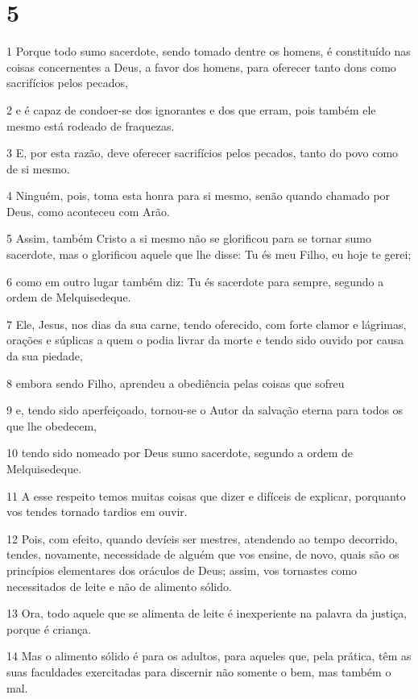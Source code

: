 \chapter{5}

\par 1 Porque todo sumo sacerdote, sendo tomado dentre os homens, é constituído nas coisas concernentes a Deus, a favor dos homens, para oferecer tanto dons como sacrifícios pelos pecados,
\par 2 e é capaz de condoer-se dos ignorantes e dos que erram, pois também ele mesmo está rodeado de fraquezas.
\par 3 E, por esta razão, deve oferecer sacrifícios pelos pecados, tanto do povo como de si mesmo.
\par 4 Ninguém, pois, toma esta honra para si mesmo, senão quando chamado por Deus, como aconteceu com Arão.
\par 5 Assim, também Cristo a si mesmo não se glorificou para se tornar sumo sacerdote, mas o glorificou aquele que lhe disse: Tu és meu Filho, eu hoje te gerei;
\par 6 como em outro lugar também diz: Tu és sacerdote para sempre, segundo a ordem de Melquisedeque.
\par 7 Ele, Jesus, nos dias da sua carne, tendo oferecido, com forte clamor e lágrimas, orações e súplicas a quem o podia livrar da morte e tendo sido ouvido por causa da sua piedade,
\par 8 embora sendo Filho, aprendeu a obediência pelas coisas que sofreu
\par 9 e, tendo sido aperfeiçoado, tornou-se o Autor da salvação eterna para todos os que lhe obedecem,
\par 10 tendo sido nomeado por Deus sumo sacerdote, segundo a ordem de Melquisedeque.
\par 11 A esse respeito temos muitas coisas que dizer e difíceis de explicar, porquanto vos tendes tornado tardios em ouvir.
\par 12 Pois, com efeito, quando devíeis ser mestres, atendendo ao tempo decorrido, tendes, novamente, necessidade de alguém que vos ensine, de novo, quais são os princípios elementares dos oráculos de Deus; assim, vos tornastes como necessitados de leite e não de alimento sólido.
\par 13 Ora, todo aquele que se alimenta de leite é inexperiente na palavra da justiça, porque é criança.
\par 14 Mas o alimento sólido é para os adultos, para aqueles que, pela prática, têm as suas faculdades exercitadas para discernir não somente o bem, mas também o mal.

